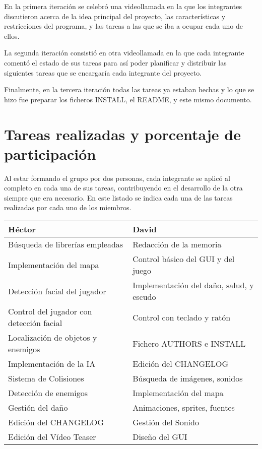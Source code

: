 \documentclass{article}
\begin{document}
En la primera iteración se celebró una videollamada en la que los integrantes discutieron
acerca de la idea principal del proyecto, las características y restricciones del programa,
y las tareas a las que se iba a ocupar cada uno de ellos.

La segunda iteración consistió en otra videollamada en la que cada integrante comentó el
estado de sus tareas para así poder planificar y distribuir las siguientes tareas que se
encargaría cada integrante del proyecto.

Finalmente, en la tercera iteración todas las tareas ya estaban hechas y lo que se hizo
fue preparar los ficheros INSTALL, el README, y este mismo documento.

\section{Tareas realizadas y porcentaje de participación}

Al estar formando el grupo por dos personas, cada integrante se aplicó al completo en cada una de sus
tareas, contribuyendo en el desarrollo de la otra siempre que era necesario. En este listado se indica
cada una de las tareas realizadas por cada uno de los miembros.

\begin{table}[H]
    \centering
    \begin{tabular}{|l|l|}
        \hline
        \textbf{Héctor} & \textbf{David} \\
        \hline
        Búsqueda de librerías empleadas & Redacción de la memoria \\
        \hline
        Implementación del mapa & Control básico del GUI y del juego \\
        \hline
        Detección facial del jugador & Implementación del daño, salud, y escudo \\
        \hline
        Control del jugador con detección facial & Control con teclado y ratón \\
        \hline
        Localización de objetos y enemigos & Fichero AUTHORS e INSTALL \\
        \hline
        Implementación de la IA & Edición del CHANGELOG \\
        \hline
        Sistema de Colisiones & Búsqueda de imágenes, sonidos \\
        \hline
        Detección de enemigos & Implementación del mapa \\
        \hline
        Gestión del daño & Animaciones, sprites, fuentes \\
        \hline
        Edición del CHANGELOG & Gestión del Sonido \\
        \hline
        Edición del Vídeo Teaser & Diseño del GUI \\
        \hline
    \end{tabular}
\end{table}
\end{document}

